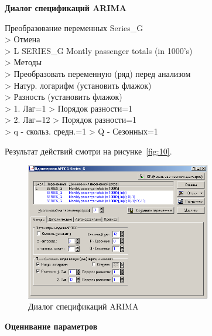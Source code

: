 
\begin{center}
  \textbf{Диалог спецификаций ARIMA}
\end{center}

Преобразование переменных Series\_G\\
> Отмена\\
> L SERIES\_G Montly passenger totals (in 1000's)\\
> Методы\\
> Преобразовать переменную (ряд) перед анализом\\
> Натур. логарифм (установить флажок)\\
> Разность (установить флажок)\\
> 1. Лаг=1 > Порядок разности=1\\
> 2. Лаг=12 > Порядок разности=1\\
> q - скольз. средн.=1 > Q - Сезонных=1

Результат действий смотри на рисунке~\ref{fig:10}.

\begin{figure}[!h]
  \centering

  \includegraphics[height=6cm]
  {inc/11.PNG}

  \caption{Диалог спецификаций ARIMA}

  \label{fig:11}
\end{figure}


\begin{center}
  \textbf{Оценивание параметров}
\end{center}

